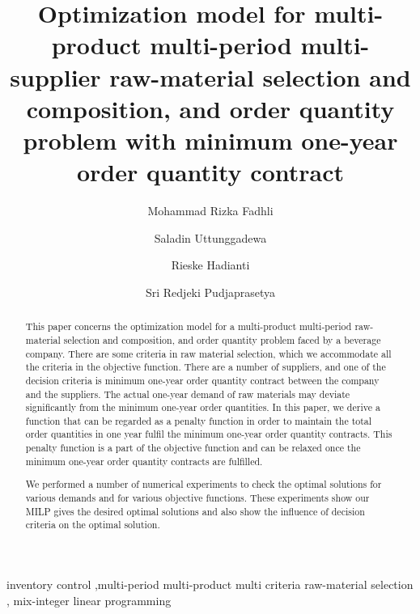 \documentclass[preprint, 3p,
authoryear]{elsarticle} %
\begin{document}
\begin{frontmatter}

  \title{Optimization model for multi-product multi-period
multi-supplier raw-material selection and composition, and order
quantity problem with minimum one-year order quantity contract}
    \author[a1]{Mohammad Rizka Fadhli%
  }
    \author[a2]{Saladin Uttunggadewa%
  }
    \author[a3]{Rieske Hadianti%
  }
    \author[a2]{Sri Redjeki Pudjaprasetya%
  }
  
  \begin{abstract}
  This paper concerns the optimization model for a multi-product
  multi-period raw-material selection and composition, and order
  quantity problem faced by a beverage company. There are some criteria
  in raw material selection, which we accommodate all the criteria in
  the objective function. There are a number of suppliers, and one of
  the decision criteria is minimum one-year order quantity contract
  between the company and the suppliers. The actual one-year demand of
  raw materials may deviate significantly from the minimum one-year
  order quantities. In this paper, we derive a function that can be
  regarded as a penalty function in order to maintain the total order
  quantities in one year fulfil the minimum one-year order quantity
  contracts. This penalty function is a part of the objective function
  and can be relaxed once the minimum one-year order quantity contracts
  are fulfilled.

  We performed a number of numerical experiments to check the optimal
  solutions for various demands and for various objective functions.
  These experiments show our MILP gives the desired optimal solutions
  and also show the influence of decision criteria on the optimal
  solution.
  \end{abstract}
    \begin{keyword}
    inventory control \sep multi-period multi-product multi criteria
raw-material selection \sep 
    mix-integer linear programming
  \end{keyword}
  
 \end{frontmatter}
\end{document}
